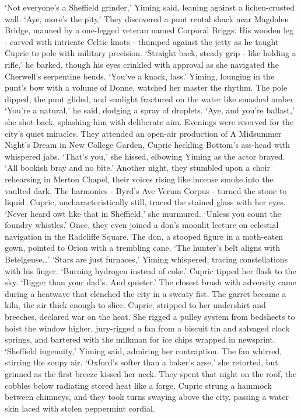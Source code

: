 `Not everyone's a Sheffield grinder,' Yiming said, leaning against a lichen-crusted wall.
`Aye, more's the pity.'
They discovered a punt rental shack near Magdalen Bridge, manned by a one-legged veteran named Corporal Briggs. His wooden leg - carved with intricate Celtic knots - thumped against the jetty as he taught Cupric to pole with military precision.
`Straight back, steady grip - like holding a rifle,' he barked, though his eyes crinkled with approval as she navigated the Cherwell's serpentine bends. `You've a knack, lass.'
Yiming, lounging in the punt's bow with a volume of Donne, watched her master the rhythm. The pole dipped, the punt glided, and sunlight fractured on the water like smashed amber. `You're a natural,' he said, dodging a spray of droplets.
`Aye, and you're ballast,' she shot back, splashing him with deliberate aim.
Evenings were reserved for the city's quiet miracles. They attended an open-air production of A Midsummer Night's Dream in New College Garden, Cupric heckling Bottom's ass-head with whispered jabs. `That's you,' she hissed, elbowing Yiming as the actor brayed. `All bookish bray and no bite.'
Another night, they stumbled upon a choir rehearsing in Merton Chapel, their voices rising like incense smoke into the vaulted dark. The harmonies - Byrd's Ave Verum Corpus - turned the stone to liquid. Cupric, uncharacteristically still, traced the stained glass with her eyes. `Never heard owt like that in Sheffield,' she murmured. `Unless you count the foundry whistles.'
Once, they even joined a don's moonlit lecture on celestial navigation in the Radcliffe Square. The don, a stooped figure in a moth-eaten gown, pointed to Orion with a trembling cane. `The hunter's belt aligns with Betelgeuse\dots'
`Stars are just furnaces,' Yiming whispered, tracing constellations with his finger. `Burning hydrogen instead of coke.'
Cupric tipped her flask to the sky. `Bigger than your dad's. And quieter.'
The closest brush with adversity came during a heatwave that clenched the city in a sweaty fist. The garret became a kiln, the air thick enough to slice. Cupric, stripped to her undershirt and breeches, declared war on the heat. She rigged a pulley system from bedsheets to hoist the window higher, jury-rigged a fan from a biscuit tin and salvaged clock springs, and bartered with the milkman for ice chips wrapped in newsprint.
`Sheffield ingenuity,' Yiming said, admiring her contraption. The fan whirred, stirring the soupy air.
`Oxford's softer than a baker's arse,' she retorted, but grinned as the first breeze kissed her neck.
They spent that night on the roof, the cobbles below radiating stored heat like a forge. Cupric strung a hammock between chimneys, and they took turns swaying above the city, passing a water skin laced with stolen peppermint cordial.
